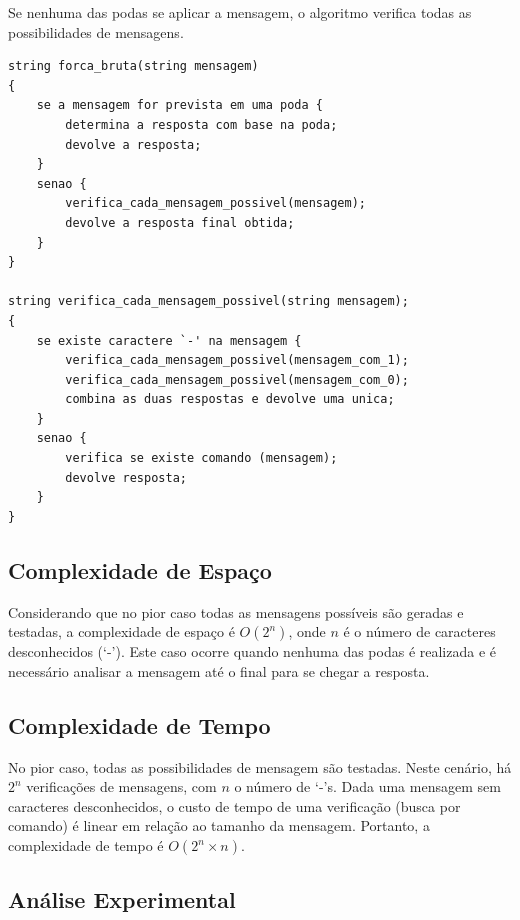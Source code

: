 \documentclass[a4paper,12pt,titlepage]{article}
\begin{document}
Se nenhuma das podas se aplicar a mensagem, o algoritmo verifica todas as possibilidades de mensagens. \\

\begin{lstlisting}[caption=Algoritmo de Força Bruta]
string forca_bruta(string mensagem)
{
    se a mensagem for prevista em uma poda {
        determina a resposta com base na poda;
        devolve a resposta;
    } 
    senao {
        verifica_cada_mensagem_possivel(mensagem);
        devolve a resposta final obtida;
    }
}

string verifica_cada_mensagem_possivel(string mensagem);
{
    se existe caractere `-' na mensagem {
        verifica_cada_mensagem_possivel(mensagem_com_1);
        verifica_cada_mensagem_possivel(mensagem_com_0);
        combina as duas respostas e devolve uma unica;
    }
    senao {
        verifica se existe comando (mensagem);
        devolve resposta;
    }
}
\end{lstlisting}

\subsection{Complexidade de Espaço}

Considerando que no pior caso todas as mensagens possíveis são geradas e testadas, a complexidade de espaço é $O(2^n)$, onde $n$ é o número de caracteres desconhecidos (`-'). Este caso ocorre quando nenhuma das podas é realizada e é necessário analisar a mensagem até o final para se chegar a resposta.

\subsection{Complexidade de Tempo}

No pior caso, todas as possibilidades de mensagem são testadas. Neste cenário, há $2^n$ verificações de mensagens, com $n$ o número de `-'s. Dada uma mensagem sem caracteres desconhecidos, o custo de tempo de uma verificação (busca por comando) é linear em relação ao tamanho da mensagem. Portanto, a complexidade de tempo é $O(2^n \times n)$.

\subsection{Análise Experimental}
\end{document}
